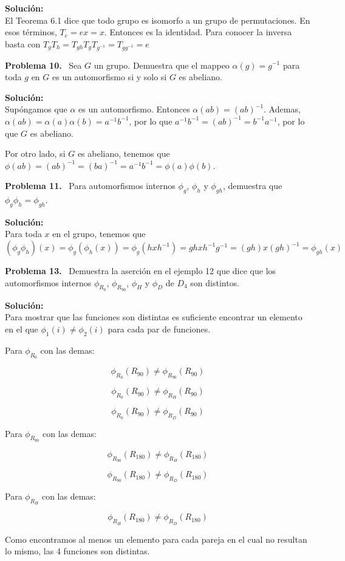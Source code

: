 \documentclass{article}
\newcounter{problem}
\newcounter{solution}
\newcommand\Problem[1]{%
  \stepcounter{problem}%
  \textbf{Problema #1.}~%
  \setcounter{solution}{0}%
}
\newcommand\TheSolution{%
  \textbf{Solución:}\\%
}
\begin{document}
\TheSolution{}
El Teorema 6.1 dice que todo grupo es isomorfo a un grupo de permutaciones. En
esos términos, $T_{e}=ex=x$. Entonces es la identidad. Para conocer la inversa
basta con $T_{g}T_{h}=T_{gh}$$ $$T_{g}T_{g^{-1}}=T_{gg^{-1}}=e$

\Problem{10} Sea $G$ un grupo. Demuestra que el mappeo $\alpha(g) = g^{-1}$
para toda $g$ en $G$ es un automorfismo si y solo si $G$ es abeliano.

\TheSolution{}
Supóngamos que $\alpha$ es un automorfismo. Entonces $\alpha(ab) =
{(ab)}^{-1}$. Ademas, $\alpha(ab) = \alpha(a) \alpha(b) = a^{-1}b^{-1}$, por lo
que $a^{-1} b^{-1} = {(ab)}^{-1} = b^{-1}a^{-1}$, por lo que $G$ es abeliano.

Por otro lado, si $G$ es abeliano, tenemos que $\phi(ab) = {(ab)}^{-1} =
{(ba)}^{-1} = a^{-1}b^{-1} = \phi(a)\phi(b)$.

\Problem{11} Para automorfismos internos $\phi_g$, $\phi_h$ y $\phi_{gh}$,
demuestra que $\phi_g\phi_h = \phi_{gh}$.

\TheSolution{}
Para toda $x$ en el grupo, tenemos que $(\phi_g\phi_h)(x) = \phi_g(\phi_h(x)) =
\phi_g(hxh^{-1}) = ghxh^{-1}g^{-1} = (gh)x{(gh)}^{-1} = \phi_{gh}(x)$

\Problem{13} Demuestra la aserción en el ejemplo 12 que dice que los
automorfismos internos $\phi _{R_0}$, $\phi_{R_{90}}$, $\phi _{H}$ y 
$\phi _{D}$ de $D_{4}$ son distintos.

\TheSolution{}
Para mostrar que las funciones son distintas es suficiente encontrar un
elemento en el que $\phi _{1} (i) \neq \phi _{2} (i)$ para cada par de
funciones.

Para $\phi _{R_0}$ con las demas:

$$\phi _{R_0} (R_{90}) \neq \phi _{R_90} (R_{90})$$

$$\phi _{R_0} (R_{90}) \neq \phi _{R_H} (R_{90})$$

$$\phi _{R_0} (R_{90}) \neq \phi _{R_D} (R_{90})$$

Para $\phi _{R_90}$ con las demas:

$$\phi _{R_90} (R_{180}) \neq \phi _{R_H} (R_{180})$$

$$\phi _{R_90} (R_{180}) \neq \phi _{R_D} (R_{180})$$

Para $\phi _{R_H}$ con las demas:

$$\phi _{R_H} (R_{180}) \neq \phi _{R_D} (R_{180})$$

Como encontramos al menos un elemento para cada pareja en el cual no
resultan lo mismo, las 4 funciones son distintas.
\end{document}
